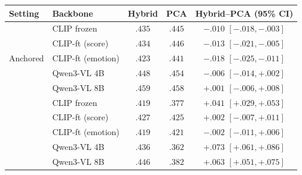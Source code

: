 \begin{tabular}{llccc}
\toprule
Setting & Backbone & Hybrid & PCA & Hybrid--PCA (95\% CI) \\
\midrule
\multirow{5}{*}{Anchored} & CLIP frozen       & $.435$ & $.445$ & $-.010$ $[-.018,-.003]$ \\
& CLIP-ft (score)   & $.434$ & $.446$ & $-.013$ $[-.021,-.005]$ \\
& CLIP-ft (emotion) & $.423$ & $.441$ & $-.018$ $[-.025,-.011]$ \\
& Qwen3-VL 4B       & $.448$ & $.454$ & $-.006$ $[-.014,+.002]$ \\
& Qwen3-VL 8B       & $.459$ & $.458$ & $+.001$ $[-.006,+.008]$ \\
\addlinespace
\multirow{5}{*}{Unanchored} & CLIP frozen       & $.419$ & $.377$ & $+.041$ $[+.029,+.053]$ \\
& CLIP-ft (score)   & $.427$ & $.425$ & $+.002$ $[-.007,+.011]$ \\
& CLIP-ft (emotion) & $.419$ & $.421$ & $-.002$ $[-.011,+.006]$ \\
& Qwen3-VL 4B       & $.436$ & $.362$ & $+.073$ $[+.061,+.086]$ \\
& Qwen3-VL 8B       & $.446$ & $.382$ & $+.063$ $[+.051,+.075]$ \\
\bottomrule
\end{tabular}
